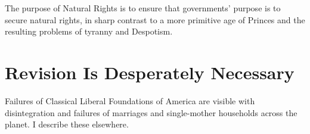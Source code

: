 \documentclass{amsart}
\begin{document}
The purpose of Natural Rights is to ensure that governments' purpose is to secure natural rights, in sharp contrast to a more primitive age of Princes and the resulting problems of tyranny and Despotism.  

\section{Revision Is Desperately Necessary}

Failures of Classical Liberal Foundations of America are visible with disintegration and failures of marriages and single-mother households across the planet.  I describe these elsewhere.  
\end{document}
